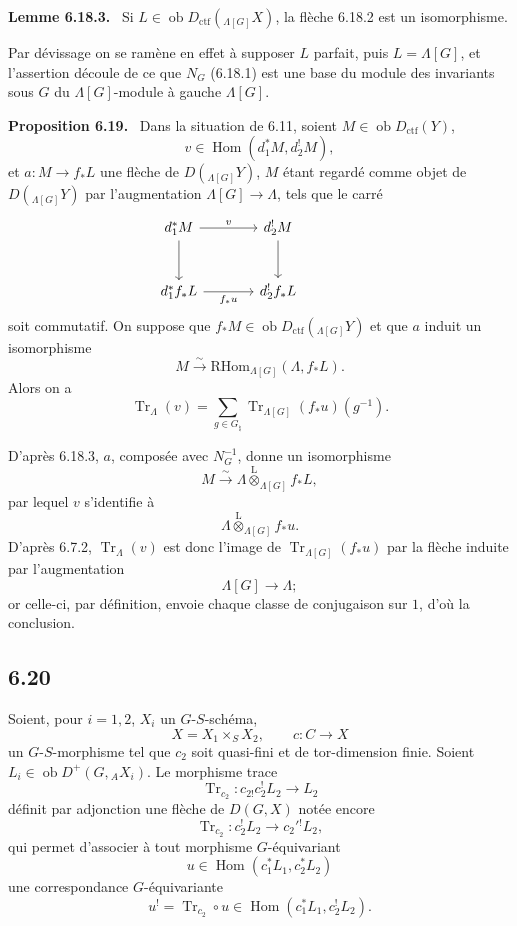\documentclass[11pt]{article}
\newenvironment{statement}[1]{\par\medskip\noindent\textbf{#1.}\ }{\par\medskip}
\DeclareMathOperator{\Hom}{Hom}
\providecommand{\RHom}{\mathrm{RHom}}
\providecommand{\Tr}{\operatorname{Tr}}
\providecommand{\Tr}{\operatorname{Tr}}
\providecommand{\lten}{\overset{\mathrm L}{\otimes}}
\providecommand{\Ob}{\operatorname{ob}}
\providecommand{\Tr}{\operatorname{Tr}}
\providecommand{\RHom}{\mathrm{RHom}}
\providecommand{\Hom}{\operatorname{Hom}}
\providecommand{\lten}{\overset{\mathrm L}{\otimes}}
\providecommand{\RHom}{\mathrm R\mathcal{H}om}
\providecommand{\lten}{\overset{\mathrm L}{\otimes}}
\providecommand{\Ob}{\operatorname{ob}}
\providecommand{\Tr}{\operatorname{Tr}}
\providecommand{\lten}{\overset{\mathrm L}{\otimes}}
\providecommand{\lten}{\overset{\mathrm L}{\otimes}}
\providecommand{\Ob}{\operatorname{Ob}}
\providecommand{\lten}{\overset{\mathrm L}{\otimes}}
\begin{document}
\begin{statement}{Lemme 6.18.3}
Si $L\in\Ob D_{\mathrm{ctf}}({}_{\Lambda[G]}X)$, la flèche 6.18.2 est un isomorphisme.
\end{statement}

Par dévissage on se ramène en effet à supposer $L$ parfait, puis $L=\Lambda[G]$, et l'assertion découle de ce que $N_G$ (6.18.1) est une base du module des invariants sous $G$ du $\Lambda[G]$-module à gauche $\Lambda[G]$.

\begin{statement}{Proposition 6.19}
Dans la situation de 6.11, soient $M\in\Ob D_{\mathrm{ctf}}(Y)$,
\[
v\in\Hom(d_1^*M,d_2^!M),
\]
et $a:M\to f_*L$ une flèche de $D({}_{\Lambda[G]}Y)$, $M$ étant regardé comme objet de $D({}_{\Lambda[G]}Y)$ par l'augmentation $\Lambda[G]\to\Lambda$, tels que le carré
\[
\begin{tikzcd}[column sep=large,row sep=large]
d_1^*M \arrow[r,"v"] \arrow[d] & d_2^!M \arrow[d] & {}\\
d_1^*f_*L \arrow[r,"f_*u"'] & d_2^!f_*L
\end{tikzcd}
\]
soit commutatif. On suppose que $f_*M\in\Ob D_{\mathrm{ctf}}({}_{\Lambda[G]}Y)$ et que $a$ induit un isomorphisme
\[
M\xrightarrow{\sim}\RHom_{\Lambda[G]}(\Lambda,f_*L).
\]
Alors on a
\begin{equation}
\Tr_{\Lambda}(v)=
\sum_{g\in G_{\natural}}\Tr_{\Lambda[G]}(f_*u)(g^{-1}).
\tag{6.19.1}
\end{equation}
\end{statement}

D'après 6.18.3, $a$, composée avec $N_G^{-1}$, donne un isomorphisme
\[
M\xrightarrow{\sim}\Lambda\lten_{\Lambda[G]}f_*L,
\]
par lequel $v$ s'identifie à
\[
\Lambda\lten_{\Lambda[G]}f_*u.
\]
D'après 6.7.2, $\Tr_{\Lambda}(v)$ est donc l'image de $\Tr_{\Lambda[G]}(f_*u)$ par la flèche induite par l'augmentation
\[
\Lambda[G]\longrightarrow \Lambda;
\]
or celle-ci, par définition, envoie chaque classe de conjugaison sur $1$, d'où la conclusion.

\subsection*{6.20}
Soient, pour $i=1,2$, $X_i$ un $G$-$S$-schéma,
\[
X=X_1\times_SX_2,\qquad c:C\to X
\]
un $G$-$S$-morphisme tel que $c_2$ soit quasi-fini et de tor-dimension finie. Soient $L_i\in\Ob D^+(G,{}_AX_i)$. Le morphisme trace
\[
\Tr_{c_2}:c_{2!}c_2^!L_2\longrightarrow L_2
\]
définit par adjonction une flèche de $D(G,X)$ notée encore
\begin{equation}
\Tr_{c_2}:c_2^!L_2\longrightarrow c_2'{}^!L_2,
\tag{6.20.1}
\end{equation}
qui permet d'associer à tout morphisme $G$-équivariant
\[
u\in\Hom(c_1^*L_1,c_2^*L_2)
\]
une correspondance $G$-équivariante
\begin{equation}
u^! = \Tr_{c_2}\circ u\in\Hom(c_1^*L_1,c_2^!L_2).
\tag{6.20.2}
\end{equation}
\end{document}

